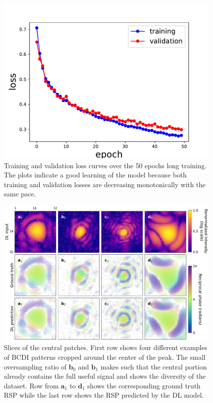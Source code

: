 \begin{figure}[H]
    \centering
    \includegraphics[width=\textwidth]{figures/Phasing/loss_central_patch.pdf}
    \caption{Training and validation loss curves over the 50 epochs long training. The plots indicate a good learning 
    of the model because both training and validation losses are decreasing monotonically with the same pace.}
    
    \label{fig:loss_3D_lowstrain}

\end{figure}

\begin{figure}[H]
    \centering
    \includegraphics[width=\textwidth]{figures/Phasing/central_patch_lowstrain_RSP.pdf}
    \caption{Slices of the central patches. First row shows four different examples of BCDI patterns cropped around the 
    center of the peak. The small oversampling ratio of $\mathbf{b}_0$ and $\mathbf{b}_1$ makes such that the central portion 
    already contains the full useful signal and shows the diversity of the dataset. Row from $\mathbf{a}_1$ to $\mathbf{d}_1$
    shows the corresponding ground truth RSP while the last row shows the RSP predicted by the DL model.  }
    
    \label{fig:centralpatch_RSP_lowstrain}

\end{figure}

